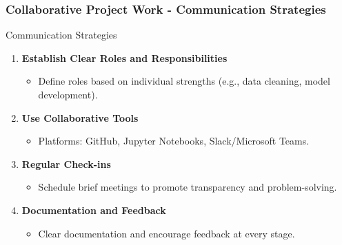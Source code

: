 \documentclass[aspectratio=169]{beamer}
\begin{document}
\begin{frame}[fragile]
    \frametitle{Collaborative Project Work - Communication Strategies}
    \begin{block}{Communication Strategies}
        \begin{enumerate}
            \item \textbf{Establish Clear Roles and Responsibilities}
                \begin{itemize}
                    \item Define roles based on individual strengths (e.g., data cleaning, model development).
                \end{itemize}

            \item \textbf{Use Collaborative Tools}
                \begin{itemize}
                    \item Platforms: GitHub, Jupyter Notebooks, Slack/Microsoft Teams.
                \end{itemize}

            \item \textbf{Regular Check-ins}
                \begin{itemize}
                    \item Schedule brief meetings to promote transparency and problem-solving.
                \end{itemize}

            \item \textbf{Documentation and Feedback}
                \begin{itemize}
                    \item Clear documentation and encourage feedback at every stage.
                \end{itemize}
        \end{enumerate}
    \end{block}
\end{frame}
\end{document}
